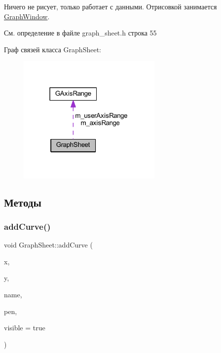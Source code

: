 Ничего не рисует, только работает с данными. Отрисовкой занимается \hyperlink{class_graph_window}{Graph\+Window}. 

См. определение в файле graph\+\_\+sheet.\+h строка 55



Граф связей класса Graph\+Sheet\+:\nopagebreak
\begin{figure}[H]
\begin{center}
\leavevmode
\includegraphics[width=199pt]{class_graph_sheet__coll__graph}
\end{center}
\end{figure}


\subsection{Методы}
\hypertarget{class_graph_sheet_abce999772aca9f5da197f13fd8912362}{}\label{class_graph_sheet_abce999772aca9f5da197f13fd8912362} 
\subsubsection{\texorpdfstring{add\+Curve()}{addCurve()}}
{\footnotesize\ttfamily void Graph\+Sheet\+::add\+Curve (\begin{DoxyParamCaption}\item[{const Q\+Vector$<$ double $>$ \&}]{x,  }\item[{const Q\+Vector$<$ double $>$ \&}]{y,  }\item[{const Q\+String \&}]{name,  }\item[{const Q\+Pen \&}]{pen,  }\item[{bool}]{visible = {\ttfamily true} }\end{DoxyParamCaption})}



